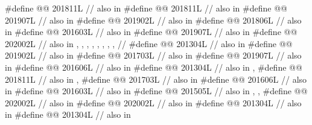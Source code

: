 \begin{codeblock}
#define @@                   201811L // also in 
#define @@                 201811L // also in 
#define @@                  201907L // also in 
#define @@                         201902L // also in 
#define @@                 201806L // also in 
#define @@           201603L // also in 
#define @@                            201907L // also in 
#define @@                          202002L
  // also in , , , , , , , ,
  // 
#define @@                 201304L // also in 
#define @@                         201902L // also in 
#define @@                        201703L // also in 
#define @@                            201907L // also in 
#define @@                           201606L // also in 
#define @@        201304L // also in , 
#define @@          201811L
  // also in , 
#define @@        201703L // also in 
#define @@ 201606L // also in 
#define @@                             201603L // also in 
#define @@     201505L
  // also in , , 
#define @@                          202002L // also in 
#define @@      202002L // also in 
#define @@                  201304L // also in 
#define @@        201304L // also in 

\end{codeblock}
